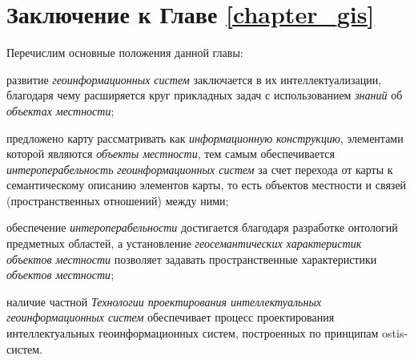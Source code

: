 \section*{Заключение к Главе \ref{chapter_gis}}

Перечислим основные положения данной главы:
\begin{textitemize}
	\item развитие \textit{геоинформационных систем} заключается в их интеллектуализации, благодаря чему расширяется круг прикладных задач с использованием \textit{знаний} об \textit{объектах местности};   
	\item предложено карту рассматривать как \textit{информационную конструкцию}, элементами которой являются \textit{объекты местности}, тем самым обеспечивается \textit{интероперабельность} \textit{геоинформационных систем} за счет перехода от карты к семантическому описанию элементов карты, то есть объектов местности и связей (пространственных отношений) между ними;
	\item обеспечение \textit{интероперабельности} достигается благодаря разработке онтологий предметных областей, а установление \textit{геосемантических характеристик объектов местности} позволяет задавать пространственные характеристики \textit{объектов местности}; 
	\item наличие частной \textit{Технологии проектирования интеллектуальных геоинформационных систем} обеспечивает процесс проектирования интеллектуальных геоинформационных систем, построенных по принципам ostis-систем.
\end{textitemize}